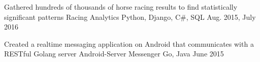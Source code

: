 

\begin{cventries}

  \cvsimpleentry
    {Gathered hundreds of thousands of horse racing results to find statistically significant patterns} %
    {Racing Analytics} %
    {Python, Django, C\#, SQL} %
    {Aug. 2015, July 2016} %

  \cvsimpleentry
    {Created a realtime messaging application on Android that communicates with a RESTful Golang server} %
    {Android-Server Messenger} %
    {Go, Java} %
    {June 2015} %

\end{cventries}

